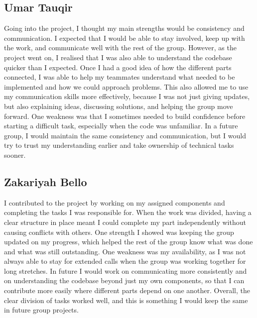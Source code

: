 \documentclass[11pt]{article}
\begin{document}
\subsection*{Umar Tauqir}

Going into the project, I thought my main strengths would be consistency and communication. I expected that I would be able to stay involved, keep up with the work, and communicate well with the rest of the group. However, as the project went on, I realised that I was also able to understand the codebase quicker than I expected. Once I had a good idea of how the different parts connected, I was able to help my teammates understand what needed to be implemented and how we could approach problems. This also allowed me to use my communication skills more effectively, because I was not just giving updates, but also explaining ideas, discussing solutions, and helping the group move forward. One weakness was that I sometimes needed to build confidence before starting a difficult task, especially when the code was unfamiliar. In a future group, I would maintain the same consistency and communication, but I would try to trust my understanding earlier and take ownership of technical tasks sooner.

\subsection*{Zakariyah Bello}

I contributed to the project by working on my assigned components and completing the tasks I was responsible for. When the work was divided, having a clear structure in place meant I could complete my part independently without causing conflicts with others. One strength I showed was keeping the group updated on my progress, which helped the rest of the group know what was done and what was still outstanding. One weakness was my availability, as I was not always able to stay for extended calls when the group was working together for long stretches. In future I would work on communicating more consistently and on understanding the codebase beyond just my own components, so that I can contribute more easily where different parts depend on one another. Overall, the clear division of tasks worked well, and this is something I would keep the same in future group projects.
\end{document}
